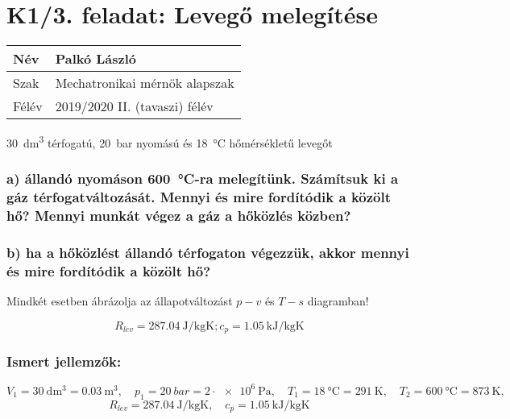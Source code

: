 \section*{K1/3. feladat: Levegő melegítése}

\begin{tabular}{ | p{2cm} | p{14cm} | } 
	\hline
	Név & Palkó László \\ 
	\hline
	Szak & Mechatronikai mérnök alapszak\\ 
	\hline
	Félév & 2019/2020 II. (tavaszi) félév \\ 
	\hline
\end{tabular}
\vspace{0.5cm}

\noindent \SI{30}{\dm\cubed} térfogatú, \SI{20}{\bar} nyomású és \SI{18}{\celsius} hőmérsékletű levegőt

\subsubsection*{a) állandó nyomáson  \SI{600}{\celsius}-ra melegítünk. Számítsuk ki a gáz térfogatváltozását. Mennyi és mire fordítódik a közölt hő? Mennyi munkát végez a gáz a hőközlés közben?}
\vspace{2mm}

\subsubsection*{b) ha a hőközlést állandó térfogaton végezzük, akkor mennyi és mire fordítódik a közölt hő?}

\noindent Mindkét esetben ábrázolja az állapotváltozást $p-v$ és $T-s$ diagramban! 

\begin{equation*}
	{R}_{lev}= \SI{287,04}{\joule\per\kilogram\kelvin};c_p=\SI{1,05}{\kilo\joule\per\kilogram\kelvin} 
\end{equation*}

\subsubsection*{Ismert jellemzők:}

\begin{equation*}
V_1=\SI{30}{\deci\meter\cubed}=\SI{0,03}{\meter\cubed},
\quad
p_1=\SI{20}{bar}=2\cdot \SI{e6}{\pascal},
\quad
T_1=\SI{18}{\celsius}=\SI{291}{\kelvin},
\quad
T_2=\SI{600}{\celsius}=\SI{873}{\kelvin},
\quad
\end{equation*}
\begin{equation*}
R_{lev}=\SI{287,04}{\joule\per\kilogram\kelvin},
\quad
c_p=\SI{1,05}{\kilo\joule\per\kilogram\kelvin}
\end{equation*}


